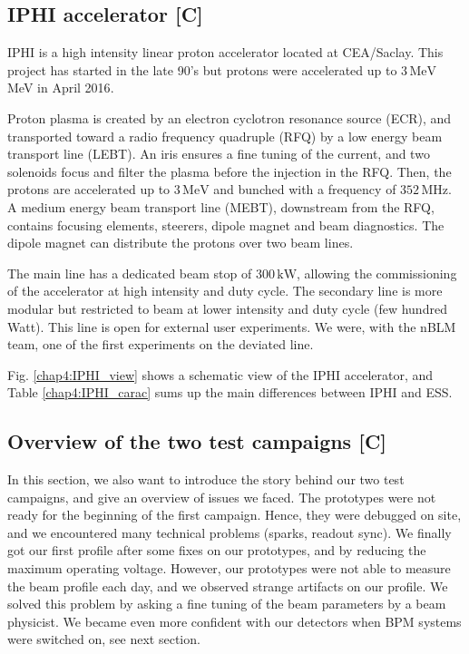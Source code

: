 \begin{refsection}
  \subsection{IPHI accelerator [C]}
  IPHI is a high intensity linear proton accelerator located at CEA/Saclay.
  This project has started in the late 90's\cite{Beau2000} but protons were accelerated up to $3\,\mathrm{MeV}$ MeV in April 2016\cite{Gobin2016}.

  Proton plasma is created by an electron cyclotron resonance source (ECR), and transported toward a radio frequency quadruple (RFQ) by a low energy beam transport line (LEBT).
  An iris ensures a fine tuning of the current, and two solenoids focus and filter the plasma before the injection in the RFQ.
  Then, the protons are accelerated up to $3\,\mathrm{MeV}$ and bunched with a frequency of $352\,\mathrm{MHz}$.
  A medium energy beam transport line (MEBT), downstream from the RFQ, contains focusing elements, steerers, dipole magnet and beam diagnostics.
  The dipole magnet can distribute the protons over two beam lines.

  

  The main line has a dedicated beam stop of $300\,\mathrm{kW}$, allowing the commissioning of the accelerator at high intensity and duty cycle.
  The secondary line is more modular but restricted to beam at lower intensity and duty cycle (few hundred Watt).
  This line is open for external user experiments.
  We were, with the nBLM team, one of the first experiments on the deviated line\cite{Senee:IPAC2018-TUPAF016}.

  Fig. \ref{chap4:IPHI_view} shows a schematic view of the IPHI accelerator, and Table \ref{chap4:IPHI_carac} sums up the main differences between IPHI and ESS.
  

  \subsection{Overview of the two test campaigns [C]}
  In this section, we also want to introduce the story behind our two test campaigns, and give an overview of issues we faced.
  The prototypes were not ready for the beginning of the first campaign.
  Hence, they were debugged on site, and we encountered many technical problems (sparks, readout sync).
  We finally got our first profile after some fixes on our prototypes, and by reducing the maximum operating voltage.
  However, our prototypes were not able to measure the beam profile each day, and we observed strange artifacts on our profile.
  We solved this problem by asking a fine tuning of the beam parameters by a beam physicist.
  We became even more confident with our detectors when BPM systems were switched on, see next section.


\end{refsection}

